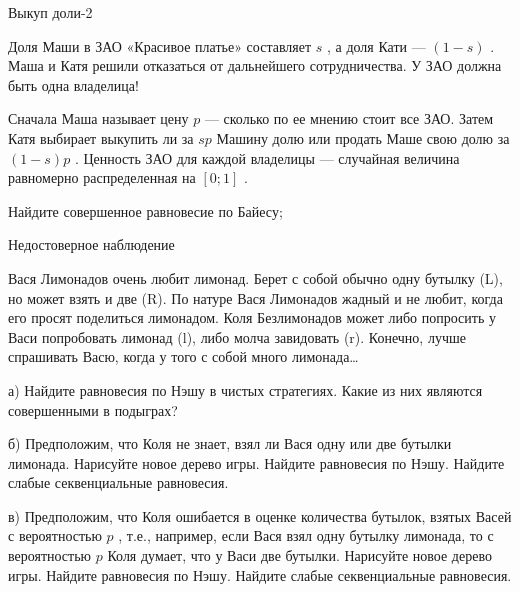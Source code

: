 \begin{problem}
 Выкуп доли-2\par
Доля Маши в ЗАО «Красивое платье» составляет  $s$ , а доля Кати —  $\left(1-s\right)$ . Маша и Катя решили отказаться от дальнейшего сотрудничества. У ЗАО должна быть одна владелица!\par
Сначала Маша называет цену  $p$  — сколько по ее мнению стоит все ЗАО. Затем Катя выбирает выкупить ли за  $sp$  Машину долю или продать Маше свою долю за  $\left(1-s\right)p$ .
Ценность ЗАО для каждой владелицы — случайная величина равномерно распределенная на  $\left[0;1\right]$ .\par
Найдите совершенное равновесие по Байесу;\par



\begin{sol}

\end{sol}
\end{problem}





\begin{problem}
 Недостоверное наблюдение\par
Вася Лимонадов очень любит лимонад. Берет с собой обычно одну бутылку (L), но может взять и две (R). По натуре Вася Лимонадов жадный и не любит, когда его просят поделиться лимонадом. Коля Безлимонадов может либо попросить у Васи попробовать лимонад (l), либо молча завидовать (r). Конечно, лучше спрашивать Васю, когда у того с собой много лимонада\ldots \par
{}

а) Найдите равновесия по Нэшу в чистых стратегиях. Какие из них являются совершенными в подыграх?\par
б) Предположим, что Коля не знает, взял ли Вася одну или две бутылки лимонада. Нарисуйте новое дерево игры. Найдите равновесия по Нэшу. Найдите слабые секвенциальные равновесия.\par
в) Предположим, что Коля ошибается в оценке количества бутылок, взятых Васей с вероятностью  $p$ , т.е., например, если Вася взял одну бутылку лимонада, то с вероятностью  $p$  Коля думает, что у Васи две бутылки. Нарисуйте новое дерево игры. Найдите равновесия по Нэшу. Найдите слабые секвенциальные равновесия.\par



\begin{sol}

\end{sol}
\end{problem}




